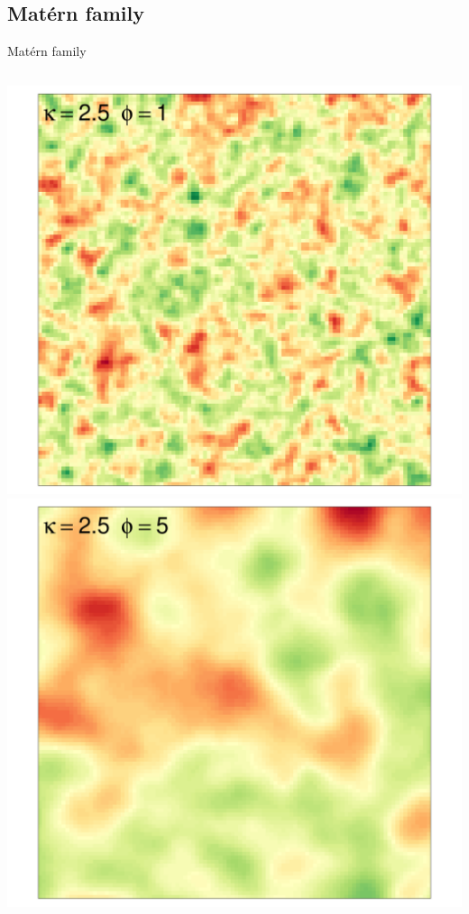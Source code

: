 \documentclass[
  ignorenonframetext,
]{beamer}
\begin{document}
\hypertarget{matuxe9rn-family-4}{%
\subsection{Matérn family}\label{matuxe9rn-family-4}}

\begin{frame}{Matérn family}
\small

\begin{columns}[T]
\begin{column}{0.33\textwidth}
\includegraphics{Lecture_1_files/figure-beamer/unnamed-chunk-38-1.pdf}
\includegraphics{Lecture_1_files/figure-beamer/unnamed-chunk-39-1.pdf}
\end{column}


\end{columns}
\end{frame}
\end{document}
